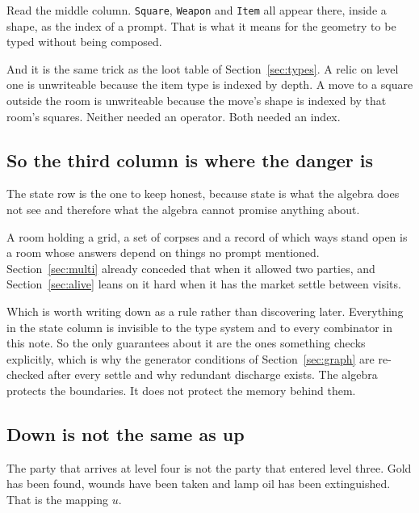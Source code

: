 \documentclass[11pt,a4paper]{article}
\begin{document}
Read the middle column. \texttt{Square}, \texttt{Weapon} and \texttt{Item} all appear there, inside
a shape, as the index of a prompt. That is what it means for the geometry to be typed without being
composed.

\begin{sectionbox}
And it is the same trick as the loot table of Section~\ref{sec:types}. A relic on level one is
unwriteable because the item type is indexed by depth. A move to a square outside the room is
unwriteable because the move's shape is indexed by that room's squares. Neither needed an operator.
Both needed an index.
\end{sectionbox}

\subsection{So the third column is where the danger is}

The state row is the one to keep honest, because state is what the algebra does not see and
therefore what the algebra cannot promise anything about.

A room holding a grid, a set of corpses and a record of which ways stand open is a room whose
answers depend on things no prompt mentioned. Section~\ref{sec:multi} already conceded that when it
allowed two parties, and Section~\ref{sec:alive} leans on it hard when it has the market settle
between visits.

\begin{alarmbox}
Which is worth writing down as a rule rather than discovering later. Everything in the state column
is invisible to the type system and to every combinator in this note. So the only guarantees about
it are the ones something checks explicitly, which is why the generator conditions of
Section~\ref{sec:graph} are re-checked after every settle and why redundant discharge exists. The
algebra protects the boundaries. It does not protect the memory behind them.
\end{alarmbox}

\subsection{Down is not the same as up}
\label{sec:updown}

The party that arrives at level four is not the party that entered level three. Gold has been
found, wounds have been taken and lamp oil has been extinguished. That is the mapping $u$.
\end{document}
